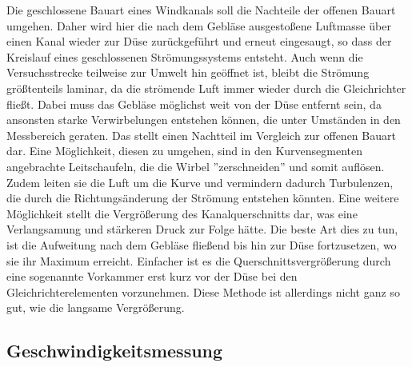 \documentclass[a4paper,10pt]{scrartcl}
\begin{document}
		Die geschlossene Bauart eines Windkanals soll die Nachteile der offenen Bauart umgehen. Daher wird hier die nach dem Gebläse ausgestoßene Luftmasse über einen Kanal wieder zur Düse
		zurückgeführt und erneut eingesaugt, so dass der Kreislauf eines geschlossenen Strömungssystems entsteht. Auch wenn die Versuchsstrecke teilweise zur Umwelt hin geöffnet ist, bleibt die Strömung größtenteils laminar, da die strömende Luft immer wieder durch die Gleichrichter fließt. 
		Dabei muss das Gebläse möglichst weit von der Düse entfernt sein, da ansonsten starke Verwirbelungen entstehen können, die unter Umständen in den Messbereich geraten. Das stellt einen Nachtteil im Vergleich zur offenen Bauart dar. Eine
		Möglichkeit, diesen zu umgehen, sind in den Kurvensegmenten angebrachte Leitschaufeln, die die Wirbel ”zerschneiden” und somit auflösen.
		Zudem leiten sie die Luft um die Kurve und vermindern dadurch Turbulenzen, die durch die Richtungsänderung der Strömung entstehen könnten. Eine weitere Möglichkeit
		stellt die Vergrößerung des Kanalquerschnitts dar, was eine Verlangsamung und stärkeren Druck zur Folge hätte. Die beste Art dies zu tun, ist die
		Aufweitung nach dem Gebläse fließend bis hin zur Düse fortzusetzen, wo sie ihr Maximum erreicht.
		Einfacher ist es die Querschnittsvergrößerung durch eine sogenannte Vorkammer erst kurz vor der
		Düse bei den Gleichrichterelementen vorzunehmen. Diese Methode ist allerdings nicht ganz so gut, wie die langsame Vergrößerung.
		
		\subsection{Geschwindigkeitsmessung}
		
\end{document}

